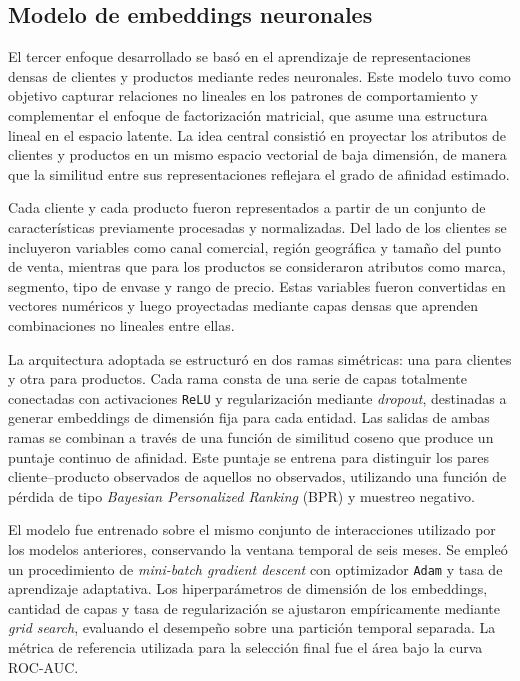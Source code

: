 \subsection{Modelo de embeddings neuronales}

El tercer enfoque desarrollado se basó en el aprendizaje de representaciones densas de clientes y productos mediante redes neuronales. Este modelo tuvo como objetivo capturar relaciones no lineales en los patrones de comportamiento y complementar el enfoque de factorización matricial, que asume una estructura lineal en el espacio latente. La idea central consistió en proyectar los atributos de clientes y productos en un mismo espacio vectorial de baja dimensión, de manera que la similitud entre sus representaciones reflejara el grado de afinidad estimado.

Cada cliente y cada producto fueron representados a partir de un conjunto de características previamente procesadas y normalizadas. Del lado de los clientes se incluyeron variables como canal comercial, región geográfica y tamaño del punto de venta, mientras que para los productos se consideraron atributos como marca, segmento, tipo de envase y rango de precio. Estas variables fueron convertidas en vectores numéricos y luego proyectadas mediante capas densas que aprenden combinaciones no lineales entre ellas. 

La arquitectura adoptada se estructuró en dos ramas simétricas: una para clientes y otra para productos. Cada rama consta de una serie de capas totalmente conectadas con activaciones \texttt{ReLU} y regularización mediante \textit{dropout}, destinadas a generar embeddings de dimensión fija para cada entidad. Las salidas de ambas ramas se combinan a través de una función de similitud coseno que produce un puntaje continuo de afinidad. Este puntaje se entrena para distinguir los pares cliente–producto observados de aquellos no observados, utilizando una función de pérdida de tipo \textit{Bayesian Personalized Ranking} (BPR) y muestreo negativo.

El modelo fue entrenado sobre el mismo conjunto de interacciones utilizado por los modelos anteriores, conservando la ventana temporal de seis meses. Se empleó un procedimiento de \textit{mini-batch gradient descent} con optimizador \texttt{Adam} y tasa de aprendizaje adaptativa. Los hiperparámetros de dimensión de los embeddings, cantidad de capas y tasa de regularización se ajustaron empíricamente mediante \textit{grid search}, evaluando el desempeño sobre una partición temporal separada. La métrica de referencia utilizada para la selección final fue el área bajo la curva ROC-AUC.

